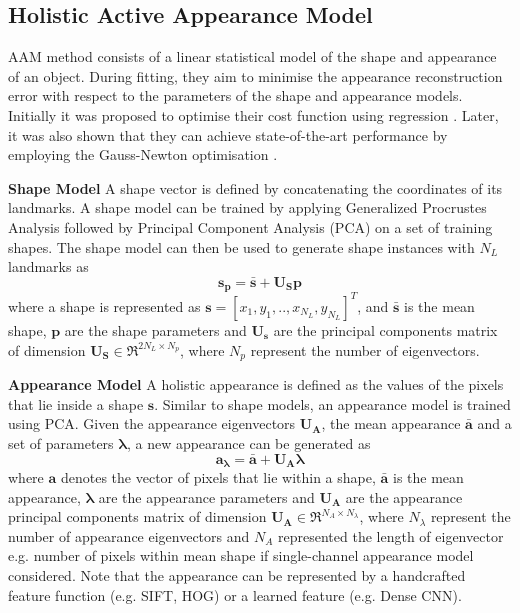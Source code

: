 \subsection{Holistic Active Appearance Model}
\label{sec:bg_aam_ear}
AAM method consists of a linear statistical model of the shape and appearance of an object. During fitting, they aim to minimise the appearance reconstruction error with respect to the parameters of the shape and appearance models. Initially it was proposed to optimise their cost function using regression \cite{Cootes2001}. Later, it was also shown that they can achieve state-of-the-art performance by employing the Gauss-Newton optimisation \cite{Matthews2004,antonakos2015feature}.

\noindent\textbf{Shape Model}
A shape vector is defined by concatenating the coordinates of its landmarks. A shape model can be trained by applying Generalized Procrustes Analysis followed by Principal Component Analysis (PCA) on a set of training shapes. The shape model can then be used to generate shape instances with $N_L$ landmarks as
\begin{equation} 
\label{eq:shape_model_ear}
\bm{s_p}=\bm{\bar{s}}+\bm{U_S}\bm{p}
\end{equation} 
where a shape is represented as $\bm{s}=[x_1,y_1,..,x_{N_L},y_{N_L}]^T$, and $\bm{\bar{s}}$ is the mean shape, $\bm{p}$ are the shape parameters and $\bm{U_s}$ are the principal components matrix of dimension $\bm{U_S} \in \Re^{2N_L\times N_p}$, where $N_p$ represent the number of eigenvectors.

\noindent\textbf{Appearance Model}
\label{sec:appearance_model_ear}
A holistic appearance is defined as the values of the pixels that lie inside a shape $\bm{s}$. Similar to shape models, an appearance model is trained using PCA. Given the appearance eigenvectors $\bm{U_A}$, the mean appearance $\bm{\bar{a}}$ and a set of parameters $\bm{\lambda}$, a new appearance can be generated as 
\begin{equation} 
\label{eq:appearance_model}
\bm{a_\lambda}=\bm{\bar{a}}+\bm{U_A}\bm{\lambda}
\end{equation} 
where $\bm{a}$ denotes the vector of pixels that lie within a shape,  $\bm{\bar{a}}$ is the mean appearance, $\bm{\lambda}$ are the appearance parameters and $\bm{U_A}$ are the appearance principal components matrix of dimension $\bm{U_A} \in \Re^{N_A\times N_\lambda}$, where $N_\lambda$ represent the number of appearance eigenvectors and $N_A$ represented the length of eigenvector e.g. number of pixels within mean shape if single-channel appearance model considered. Note that the appearance can be represented by a handcrafted feature function (e.g. SIFT, HOG) or a learned feature (e.g. Dense CNN).

